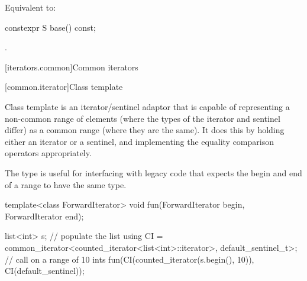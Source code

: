 \begin{itemdescr}
\pnum
\effects
Equivalent to: 
\end{itemdescr}

%
\begin{itemdecl}
constexpr S base() const;
\end{itemdecl}

\begin{itemdescr}
\pnum
\returns
{}.
\end{itemdescr}

[iterators.common]{Common iterators}

[common.iterator]{Class template }

\pnum
Class template  is an iterator/sentinel adaptor that is
capable of representing a non-common range of elements (where the types of the
iterator and sentinel differ) as a common range (where they are the same). It
does this by holding either an iterator or a sentinel, and implementing the
equality comparison operators appropriately.

\pnum
\begin{note}
The  type is useful for interfacing with legacy
code that expects the begin and end of a range to have the same type.
\end{note}

\pnum
\begin{example}
\begin{codeblock}
template<class ForwardIterator>
void fun(ForwardIterator begin, ForwardIterator end);

list<int> s;
// populate the list 
using CI = common_iterator<counted_iterator<list<int>::iterator>, default_sentinel_t>;
// call  on a range of 10 ints
fun(CI(counted_iterator(s.begin(), 10)), CI(default_sentinel));
\end{codeblock}
\end{example}

